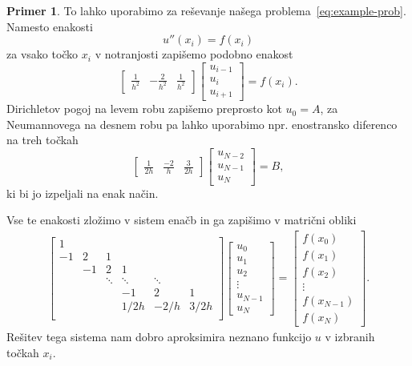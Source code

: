 \documentclass[12pt,a4paper,twoside]{article}
\theoremstyle{definition} %
\newtheorem{primer}[definicija]{Primer}
\theoremstyle{plain} %
\numberwithin{equation}{section}
\begin{document}
\begin{primer}
To lahko uporabimo za reševanje našega problema~\eqref{eq:example-prob}.
Namesto enakosti
\[ u''(x_i) = f(x_i) \]
za vsako točko $x_i$ v notranjosti zapišemo podobno enakost
\[
  \begin{bmatrix}
    \frac{1}{h^2} & -\frac{2}{h^2} & \frac{1}{h^2}
  \end{bmatrix}\begin{bmatrix}
    u_{i-1} \\ u_{i} \\ u_{i+1}
  \end{bmatrix} = f(x_i).
\]
Dirichletov pogoj na levem robu zapišemo preprosto kot $u_0 = A$,
za Neumannovega na desnem robu pa lahko uporabimo npr. enostransko diferenco
na treh točkah \[
  \begin{bmatrix}
    \frac{1}{2h} & \frac{-2}{h} & \frac{3}{2h}
  \end{bmatrix}\begin{bmatrix}
    u_{N-2} \\ u_{N-1} \\ u_{N}
  \end{bmatrix} = B,
\]
ki bi jo izpeljali na enak način.

Vse te enakosti zložimo v sistem enačb in ga zapišimo v matrični obliki
\begin{align*}
  \begin{bmatrix}
    1 &  \\
    -1 & 2 & 1 \\
    & -1 & 2 & 1 \\
    & & \!\ddots & \!\ddots & \! \ddots \\
    &&& -1 & 2 & 1 \\
    &&& 1/2h & -2/h & 3/2h \\
  \end{bmatrix}
\begin{bmatrix}
  u_0 \\ u_1 \\ u_2 \\ \vdots \\ u_{N-1} \\ u_N
\end{bmatrix}
 =
 \begin{bmatrix}
   f(x_0) \\
   f(x_1) \\
   f(x_2) \\
   \vdots \\
   f(x_{N-1}) \\
   f(x_N)
 \end{bmatrix}.
\end{align*}
Rešitev tega sistema nam dobro aproksimira neznano funkcijo $u$ v izbranih
točkah $x_i$.
\end{primer}
\end{document}

